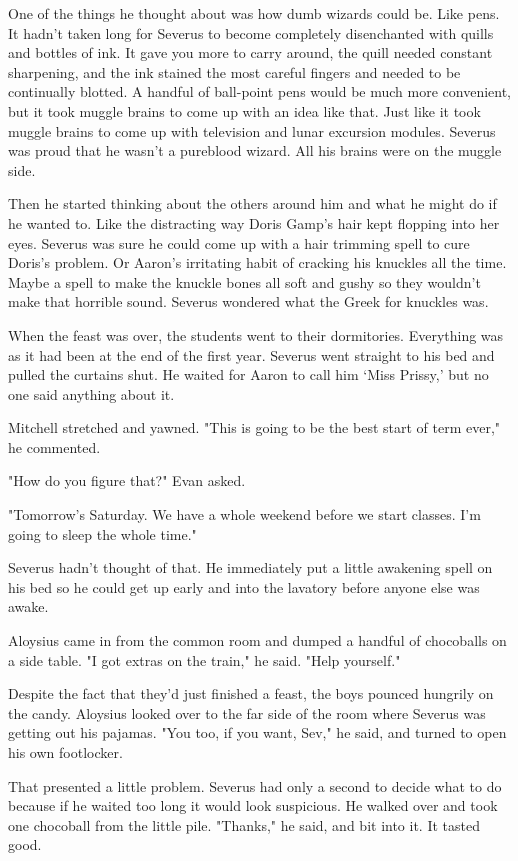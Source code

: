 \documentclass[a4paper,11pt]{article}
\begin{document}
One of the things he thought about was how dumb wizards could be. Like pens. It hadn't taken long for Severus to become completely disenchanted with quills and bottles of ink. It gave you more to carry around, the quill needed constant sharpening, and the ink stained the most careful fingers and needed to be continually blotted. A handful of ball-point pens would be much more convenient, but it took muggle brains to come up with an idea like that. Just like it took muggle brains to come up with television and lunar excursion modules. Severus was proud that he wasn't a pureblood wizard. All his brains were on the muggle side.

Then he started thinking about the others around him and what he might do if he wanted to. Like the distracting way Doris Gamp's hair kept flopping into her eyes. Severus was sure he could come up with a hair trimming spell to cure Doris's problem. Or Aaron's irritating habit of cracking his knuckles all the time. Maybe a spell to make the knuckle bones all soft and gushy so they wouldn't make that horrible sound. Severus wondered what the Greek for knuckles was.

When the feast was over, the students went to their dormitories. Everything was as it had been at the end of the first year. Severus went straight to his bed and pulled the curtains shut. He waited for Aaron to call him `Miss Prissy,' but no one said anything about it.

Mitchell stretched and yawned. "This is going to be the best start of term ever," he commented.

"How do you figure that?" Evan asked.

"Tomorrow's Saturday. We have a whole weekend before we start classes. I'm going to sleep the whole time."

Severus hadn't thought of that. He immediately put a little awakening spell on his bed so he could get up early and into the lavatory before anyone else was awake.

Aloysius came in from the common room and dumped a handful of chocoballs on a side table. "I got extras on the train," he said. "Help yourself."

Despite the fact that they'd just finished a feast, the boys pounced hungrily on the candy. Aloysius looked over to the far side of the room where Severus was getting out his pajamas. "You too, if you want, Sev," he said, and turned to open his own footlocker.

That presented a little problem. Severus had only a second to decide what to do because if he waited too long it would look suspicious. He walked over and took one chocoball from the little pile. "Thanks," he said, and bit into it. It tasted good.
\end{document}
